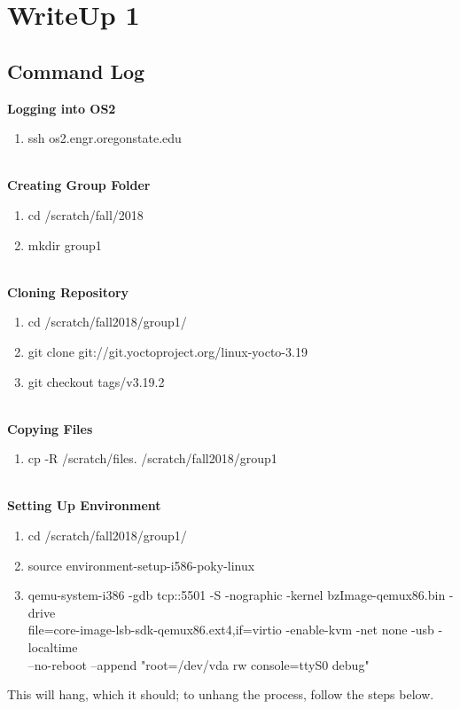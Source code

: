 \documentclass[letterpaper,10pt]{article}
\begin{document}

\section{WriteUp 1}

\subsection{Command Log}
{\bfseries Logging into OS2}\\
\begin{enumerate}
\item ssh os2.engr.oregonstate.edu\\\\
\end{enumerate}
{\bfseries Creating Group Folder}\\
\begin{enumerate}
\item cd /scratch/fall/2018\\
\item mkdir group1\\\\
\end{enumerate}
{\bfseries Cloning Repository}\\
\begin{enumerate}
\item cd /scratch/fall2018/group1/\\
\item git clone git://git.yoctoproject.org/linux-yocto-3.19\\
\item git checkout tags/v3.19.2\\\\
\end{enumerate}
{\bfseries Copying Files}\\
\begin{enumerate}
\item cp -R /scratch/files. /scratch/fall2018/group1\\\\
\end{enumerate}
{\bfseries Setting Up Environment}\\
\begin{enumerate}
\item cd /scratch/fall2018/group1/\\
\item source environment-setup-i586-poky-linux\\
\item qemu-system-i386 -gdb tcp::5501 -S -nographic -kernel bzImage-qemux86.bin -drive\\ file=core-image-lsb-sdk-qemux86.ext4,if=virtio -enable-kvm -net none -usb -localtime\\
--no-reboot --append "root=/dev/vda rw console=ttyS0 debug"\\
\end{enumerate}
This will hang, which it should; to unhang the process, follow the steps below.\\
\end{document}
